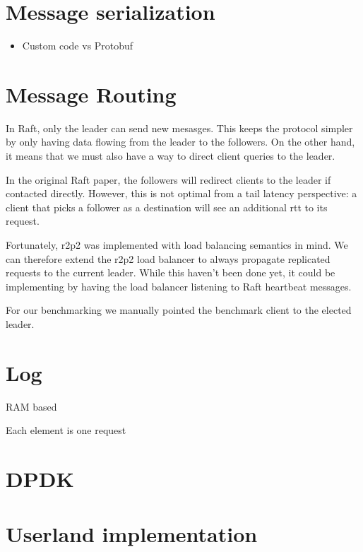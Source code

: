 \section{Message serialization}


\begin{itemize}
    \item Custom code vs Protobuf
\end{itemize}



\section{Message Routing}

In Raft, only the leader can send new mesasges.
This keeps the protocol simpler by only having data flowing from the leader to the followers.
On the other hand, it means that we must also have a way to direct client queries to the leader.

In the original Raft paper\cite{raft}, the followers will redirect clients to the leader if contacted directly.
However, this is not optimal from a tail latency perspective: a client that picks a follower as a destination will see an additional \gls{rtt} to its request.

Fortunately, \gls{r2p2} was implemented with load balancing semantics in mind.
We can therefore extend the \gls{r2p2} load balancer to always propagate replicated requests to the current leader.
While this haven't been done yet, it could be implementing by having the load balancer listening to Raft heartbeat messages.

For our benchmarking we manually pointed the benchmark client to the elected leader.

\section{Log}

RAM based

Each element is one request

\section{DPDK}

\section{Userland implementation}

